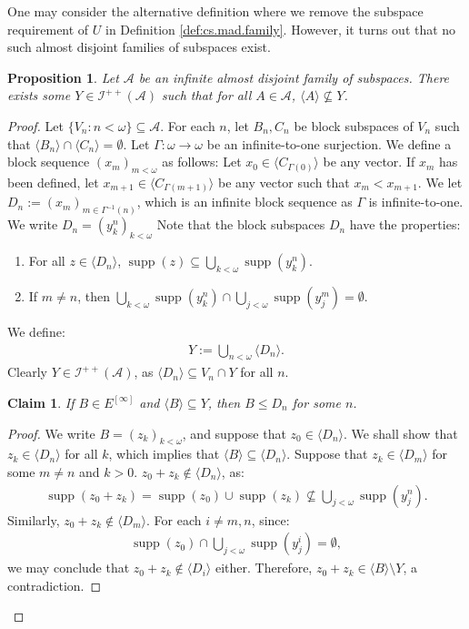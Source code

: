 \documentclass[11pt,reqno]{amsart}
\theoremstyle{plain}
\numberwithin{equation}{section}
\newtheorem{proposition}[theorem]{Proposition}
\newtheorem{claim}{Claim}
\theoremstyle{definition}
\newcommand{\func}{\operatorname}
\renewcommand{\c}[1]{\langle #1 \rangle}
\newcommand{\cal}{\mathcal}
\newcommand{\supp}{\func{supp}}
\newcommand{\A}{\cal{A}}
\newcommand{\I}{\cal{I}}
\newenvironment{midproof}[1][Proof]
  {\begin{proof}[#1]\renewcommand{\qedsymbol}{$\blacksquare$}}
  {\end{proof}}
\begin{document}
One may consider the alternative definition where we remove the subspace requirement of $U$ in Definition \ref{def:cs.mad.family}. However, it turns out that no such almost disjoint families of subspaces exist.

\begin{proposition}
    Let $\A$ be an infinite almost disjoint family of subspaces. There exists some $Y \in \I^{++}(\A)$ such that for all $A \in \A$, $\c{A} \not\subseteq Y$.
\end{proposition}

\begin{proof}
    Let $\{V_n : n < \omega\} \subseteq \A$. For each $n$, let $B_n,C_n$ be block subspaces of $V_n$ such that $\c{B_n} \cap \c{C_n} = \emptyset$. Let $\Gamma : \omega \to \omega$ be an infinite-to-one surjection. We define a block sequence $(x_m)_{m<\omega}$ as follows: Let $x_0 \in \c{C_{\Gamma(0)}}$ be any vector. If $x_m$ has been defined, let $x_{m+1} \in \c{C_{\Gamma(m+1)}}$ be any vector such that $x_m < x_{m+1}$. We let $D_n := (x_m)_{m \in \Gamma^{-1}(n)}$, which is an infinite block sequence as $\Gamma$ is infinite-to-one. We write $D_n = (y_k^n)_{k<\omega}$ Note that the block subspaces $D_n$ have the properties: 
    \begin{enumerate}
        \item For all $z \in \c{D_n}$, $\supp(z) \subseteq \bigcup_{k<\omega} \supp(y_k^n)$.
        
        \item If $m \neq n$, then $\bigcup_{k<\omega} \supp(y_k^n) \cap \bigcup_{j<\omega} \supp(y_j^m) = \emptyset$.
    \end{enumerate}
    We define:
    \begin{align*}
        Y := \bigcup_{n<\omega} \c{D_n}.
    \end{align*}
    Clearly $Y \in \I^{++}(\A)$, as $\c{D_n} \subseteq V_n \cap Y$ for all $n$. 

    \begin{claim}
        If $B \in E^{[\infty]}$ and $\c{B} \subseteq Y$, then $B \leq D_n$ for some $n$.
    \end{claim}

    \begin{midproof}
        We write $B = (z_k)_{k<\omega}$, and suppose that $z_0 \in \c{D_n}$. We shall show that $z_k \in \c{D_n}$ for all $k$, which implies that $\c{B} \subseteq \c{D_n}$. Suppose that $z_k \in \c{D_m}$ for some $m \neq n$ and $k > 0$. $z_0 + z_k \notin \c{D_n}$, as:
        \begin{align*}
            \supp(z_0 + z_k) = \supp(z_0) \cup \supp(z_k) \not\subseteq \bigcup_{j<\omega} \supp(y_j^n).
        \end{align*}
        Similarly, $z_0 + z_k \notin \c{D_m}$. For each $i \neq m,n$, since:
        \begin{align*}
            \supp(z_0) \cap \bigcup_{j<\omega} \supp(y_j^i) = \emptyset,
        \end{align*}
        we may conclude that $z_0 + z_k \notin \c{D_i}$ either. Therefore, $z_0 + z_k \in \c{B} \setminus Y$, a contradiction.
    \end{midproof}


\end{proof}
\end{document}
